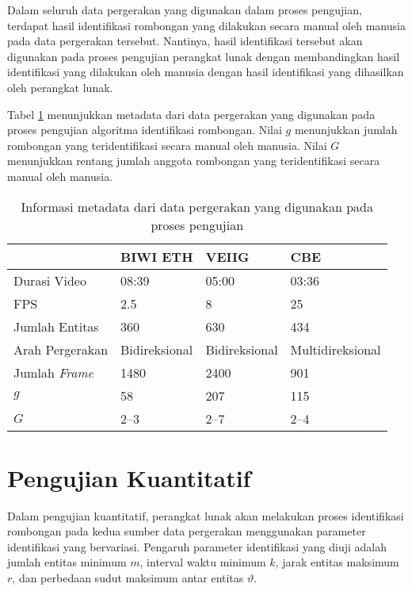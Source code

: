 Dalam seluruh data pergerakan yang digunakan dalam proses pengujian, terdapat hasil identifikasi rombongan yang dilakukan secara manual oleh manusia pada data pergerakan tersebut. Nantinya, hasil identifikasi tersebut akan digunakan pada proses pengujian perangkat lunak dengan membandingkan hasil identifikasi yang dilakukan oleh manusia dengan hasil identifikasi yang dihasilkan oleh perangkat lunak.

Tabel \ref{bab6:metadata-pergerakan} menunjukkan metadata dari data pergerakan yang digunakan pada proses pengujian algoritma identifikasi rombongan. Nilai $g$ menunjukkan jumlah rombongan yang teridentifikasi secara manual oleh manusia. Nilai $G$ menunjukkan rentang jumlah anggota rombongan yang teridentifikasi secara manual oleh manusia.

\begin{table}[t]
    \centering
    \begin{tabular}{p{3cm} p{2.5cm} p{2.5cm} p{3cm}}
        \hline
        & \textbf{BIWI ETH} & \textbf{VEIIG} & \textbf{CBE} \\
        \hline
        Durasi Video & 08:39 & 05:00 & 03:36 \\
        FPS & 2.5 & 8 & 25 \\
        Jumlah Entitas & 360 & 630 & 434 \\
        Arah Pergerakan & Bidireksional & Bidireksional & Multidireksional \\
        Jumlah \textit{Frame} & 1480 & 2400 & 901 \\
        $g$ & 58 & 207 & 115 \\
        $G$ & 2--3 & 2--7 & 2--4 \\
        \hline
    \end{tabular}
    \caption[Metadata sumber data pergerakan]{Informasi metadata dari data pergerakan yang digunakan pada proses pengujian}
    \label{bab6:metadata-pergerakan}
\end{table}

\section{Pengujian Kuantitatif}
\label{sec:quantitative}

Dalam pengujian kuantitatif, perangkat lunak akan melakukan proses identifikasi rombongan pada kedua sumber data pergerakan menggunakan parameter identifikasi yang bervariasi. Pengaruh parameter identifikasi yang diuji adalah jumlah entitas minimum $m$, interval waktu minimum $k$, jarak entitas maksimum $r$, dan perbedaan sudut maksimum antar entitas $\vartheta$. 

